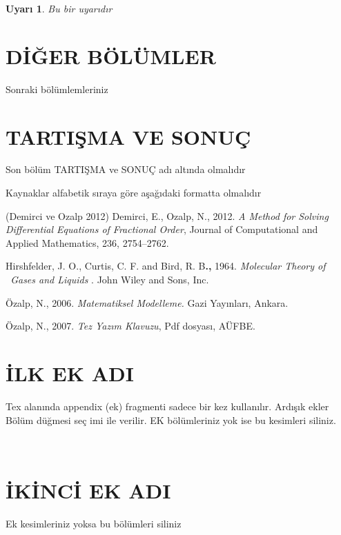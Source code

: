 \documentclass[12pt,a4paper,turkish]{book}
\newtheorem{remark}{Uyar\i}[chapter]
\begin{document}
\begin{remark}
Bu bir uyarıdır \  \ 
\end{remark}

\chapter{D\.{I}\u{G}ER B\"{O}L\"{U}MLER}

Sonraki bölümlemleriniz

\chapter{TARTI\c{S}MA VE SONU\c{C}}

Son bölüm TARTIŞMA  ve SONUÇ adı altında olmalıdır

Kaynaklar alfabetik sıraya göre aşağıdaki formatta olmalıdır

\bigskip

\begin{thebibliography}{(Demirci ve Ozalp 2012)}
 Demirci, E., Ozalp, N., 2012. \textsl{%
A Method for Solving Differential Equations of Fractional Order}, Journal of
Computational and Applied Mathematics, 236, 2754--2762.

 Hirshfelder, J. O., Curtis, C. F. and
Bird, R. B\textbf{.,} 1964. \textsl{Molecular Theory of \ Gases and Liquids}%
. John Wiley and Sons, Inc.

 \"{O}zalp, N., 2006. \textsl{Matematiksel
Modelleme}\textit{.} Gazi Yay\i nlar\i , Ankara.

 \"{O}zalp, N., 2007. \textsl{Tez Yaz\i m
Klavuzu}, Pdf dosyas\i , A\"{U}FBE.
\end{thebibliography}

\bigskip

\chapter{\.{I}LK EK ADI}

Tex alan\i nda \TEXTsymbol{\backslash}appendix (ek) fragmenti sadece bir kez
kullan\i l\i r. Ard\i \c{s}\i k ekler B\"{o}l\"{u}m d\"{u}\u{g}mesi se\c{c}%
imi ile verilir. EK b\"{o}l\"{u}mleriniz yok ise bu kesimleri siliniz.

\ 

\chapter{\.{I}K\.{I}NC\.{I} EK ADI}

Ek kesimleriniz yoksa bu b\"{o}l\"{u}mleri siliniz

\bigskip

\begin{ozgecmis}
\label{son}
\end{ozgecmis}
\end{document}
